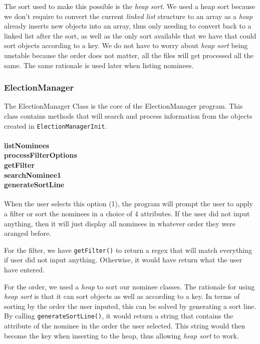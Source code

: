 \documentclass[a4paper, 12pt, titlepage]{article}
\newcommand{\code}[1]{\small\texttt{#1}\normalsize}
\begin{document}
The sort used to make this possible is the \textit{heap sort}. We used a heap
sort because we don't require to convert the current \textit{linked list}
structure to an array as a \textit{heap} already inserts new objects into
an array, thus only needing to convert back to a linked list after the sort,
as well as the only sort available that we have that could sort objects
according to a key. We do not have to worry about \textit{heap sort} being
unstable because the order does not matter, all the files will get processed
all the same. The same rationale is used later when listing nominees.

\newpage

\subsubsection{ElectionManager}

The ElectionManager Class is the core of the ElectionManager program. This
class contains methods that will search and process information from the
objects created in \code{ElectionManagerInit}.

\paragraph{listNominees \\
           processFilterOptions \\
           getFilter \\
           searchNominee1 \\
           generateSortLine
} \hspace{0pt}

When the user selects this option (1), the program will prompt the user
to apply a filter or sort the nominees in a choice of 4 attributes. If the
user did not input anything, then it will just display all nominees in
whatever order they were aranged before.

For the filter, we have \code{getFilter()} to return a regex that will match
everything if user did not input anything. Otherwise, it would have return what
the user have entered.

For the order, we used a \textit{heap} to sort our nominee classes. The
rationale for using \textit{heap sort} is that it can sort objects as well
as according to a key. In terms of sorting by the order the user inputed, this
can be solved by generating a sort line. By calling \code{generateSortLine()},
it would return a string that contains the attribute of the nominee in the
order the user selected. This string would then become the key when inserting
to the heap, thus allowing \textit{heap sort} to work.
\end{document}
